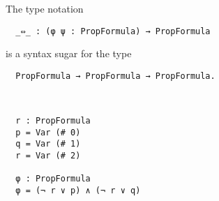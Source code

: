 \documentclass[../main.tex]{subfiles}
\begin{document}
\begin{myremark}
The type notation
\begin{verbatim}
  _⇔_ : (φ ψ : PropFormula) → PropFormula
\end{verbatim}
is a syntax sugar for the type
\begin{verbatim}
  PropFormula → PropFormula → PropFormula.
\end{verbatim}
\end{myremark}

\begin{myexamplenum}
\hspace*{5cm}\\[3mm]
\begin{verbatim}
  r : PropFormula
  p = Var (# 0)
  q = Var (# 1)
  r = Var (# 2)

  φ : PropFormula
  φ = (¬ r ∨ p) ∧ (¬ r ∨ q)
\end{verbatim}
\end{myexamplenum}
\end{document}

